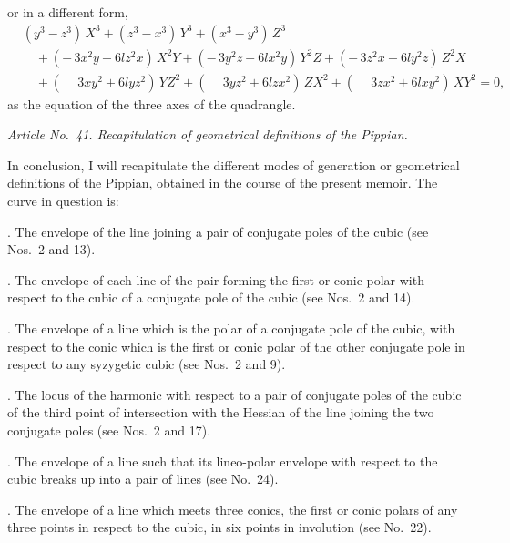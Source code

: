 \documentclass[11pt]{article}
\begin{document}
or in a different form,
\begin{align*}
&(y^3 - z^3)\, X^3 + (z^3 - x^3)\, Y^3 + (x^3 - y^3)\, Z^3 \\
&\quad + (-\,3 x^2 y - 6 l z^2 x)\, X^2 Y + (-\,3 y^2 z - 6 l x^2 y)\, Y^2 Z + (-\,3 z^2 x - 6 l y^2 z)\, Z^2 X \\
&\quad + (\phantom{-}3 x y^2 + 6 l y z^2)\, Y Z^2 + (\phantom{-}3 y z^2 + 6 l z x^2)\, Z X^2 + (\phantom{-}3 z x^2 + 6 l x y^2)\, X Y^2 = 0,
\end{align*}
as the equation of the three axes of the quadrangle.

\bigskip

\textit{Article No.~41. Recapitulation of geometrical definitions of the Pippian.}

\medskip

\noindent In conclusion, I will recapitulate the different modes of generation or geometrical definitions of the Pippian, obtained in the course of the present memoir. The curve in question is:

\medskip

. The envelope of the line joining a pair of conjugate poles of the cubic (see Nos.~2 and 13).

\medskip

. The envelope of each line of the pair forming the first or conic polar with respect to the cubic of a conjugate pole of the cubic (see Nos.~2 and 14).

\medskip

. The envelope of a line which is the polar of a conjugate pole of the cubic, with respect to the conic which is the first or conic polar of the other conjugate pole in respect to any syzygetic cubic (see Nos.~2 and 9).

\medskip

. The locus of the harmonic with respect to a pair of conjugate poles of the cubic of the third point of intersection with the Hessian of the line joining the two conjugate poles (see Nos.~2 and 17).

\medskip

. The envelope of a line such that its lineo-polar envelope with respect to the cubic breaks up into a pair of lines (see No.~24).

\medskip

. The envelope of a line which meets three conics, the first or conic polars of any three points in respect to the cubic, in six points in involution (see No.~22).
\end{document}
